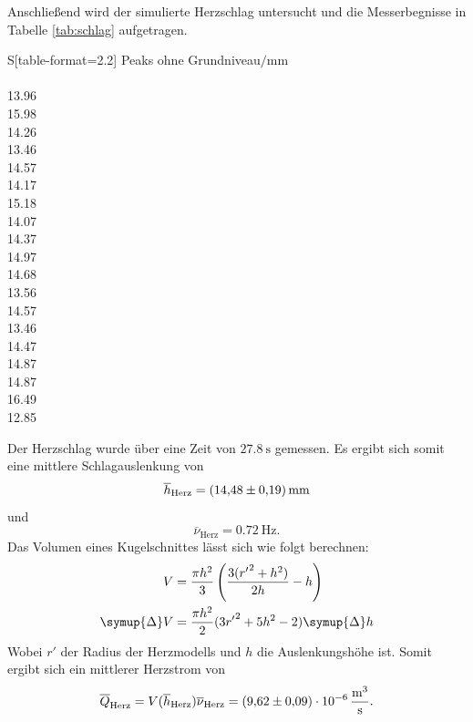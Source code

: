 Anschließend wird der simulierte Herzschlag untersucht und die Messerbegnisse in Tabelle \ref{tab:schlag} aufgetragen.
\begin{table}[H]
    \caption{Messung des Herzschlags.}
    \label{tab:schlag}
    \centering
    \begin{tabular}{S[table-format=2.2]}
        \toprule
        {Peaks ohne Grundniveau$/\si{\milli\meter}$} \\
         \\
            13.96 \\
            15.98 \\
            14.26 \\
            13.46 \\
            14.57 \\
            14.17 \\
            15.18 \\
            14.07 \\
            14.37 \\
            14.97 \\
            14.68 \\
            13.56 \\
            14.57 \\
            13.46 \\
            14.47 \\
            14.87 \\
            14.87 \\
            16.49 \\
            12.85 \\
        \bottomrule
    \end{tabular}
\end{table}
\noindent

Der Herzschlag wurde über eine Zeit von $\SI{27.8}{\second}$ gemessen.
Es ergibt sich somit eine mittlere Schlagauslenkung von
\begin{equation}
   \overline{h}_\text{Herz} = \SI{14.48\pm0.19}{\milli\meter}
\end{equation}
und 
\begin{equation}
   \overline{\nu}_\text{Herz} = \SI{0.72}{\hertz}.
\end{equation}
Das Volumen eines Kugelschnittes lässt sich wie folgt berechnen:
\begin{align}
    V &= \frac{\pi h^2}{3}\left( \frac{3({r'}^2+h^2)}{2h} - h \right) \\
    \symup{\Delta}V &= \frac{\pi h^2}{2}(3{r'}^2+5h^2-2)\symup{\Delta}h
\end{align}
Wobei $r'$ der Radius der Herzmodells und $h$ die Auslenkungshöhe ist.
Somit ergibt sich ein mittlerer Herzstrom von
\begin{equation}
   \overline{Q}_\text{Herz} = V(\overline{h}_\text{Herz})\overline{\nu}_\text{Herz} = \SI{9.62\pm0.09e-6}{\meter\cubed\per\second}.
\end{equation}
